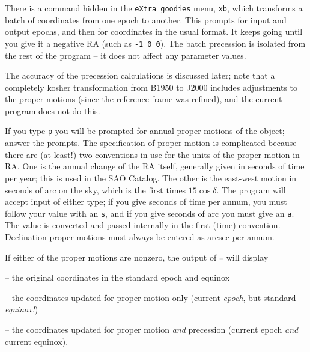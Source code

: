 There is a command hidden in the {\tt eXtra goodies} menu, {\tt xb},
which transforms a batch of coordinates from one epoch to another.
This prompts for input and output epochs, and then for coordinates
in the usual format.  It keeps going until you give it a negative
RA (such as {\tt -1 0 0}).  The batch precession is isolated from
the rest of the program -- it does not affect any parameter values. 

The accuracy of the precession calculations is discussed later; note that
a completely kosher transformation from B1950 to J2000 includes adjustments
to the proper motions (since the reference frame was refined), and the current
program does not do this.

\par
If you type {\tt p} you will be prompted for annual proper motions of
the object; answer the prompts.  The specification of proper motion is 
complicated because
there are (at least!) two conventions in use for the units of the
proper motion in RA.  One is the annual change of the RA itself, generally
given in seconds of time per year; this is used in the SAO Catalog.
The other is the east-west motion in seconds of arc on the sky,
which is the first times $15 \cos \delta$.  The program will accept
input of either type; if you give seconds of time per annum, you
must follow your value with an {\tt s}, and if you give seconds of
arc you must give an {\tt a}.  The value is converted and passed
internally in the first (time) convention.
Declination proper motions must always be entered as
arcsec per annum.
\par
If either of the proper motions are nonzero, the output of {\tt =} will display

\item{--} the original coordinates in the standard epoch and equinox

\item{--} the coordinates updated for proper motion only (current
{\it epoch}, but standard {\it equinox!\/})

\item{--} the coordinates updated for proper motion {\it and} precession
(current epoch {\it and} current equinox).

